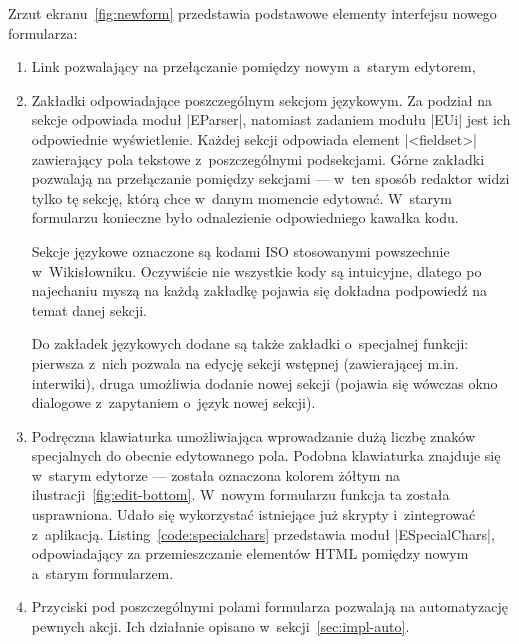 Zrzut ekranu~\ref{fig:newform} przedstawia podstawowe elementy interfejsu nowego formularza:
\begin{enumerate}
\item Link pozwalający na przełączanie pomiędzy nowym a~starym edytorem,
\item Zakładki odpowiadające poszczególnym sekcjom językowym. Za podział na sekcje odpowiada moduł \kod|EParser|, natomiast zadaniem modułu \kod|EUi| jest ich odpowiednie wyświetlenie. Każdej sekcji odpowiada element \kod|<fieldset>| zawierający pola tekstowe z~poszczególnymi podsekcjami. Górne zakładki pozwalają na przełączanie pomiędzy sekcjami --- w~ten sposób redaktor widzi tylko tę sekcję, którą chce w~danym momencie edytować. W~starym formularzu konieczne było odnalezienie odpowiedniego kawałka kodu.

Sekcje językowe oznaczone są kodami ISO stosowanymi powszechnie w~Wikisłowniku. Oczywiście nie wszystkie kody są intuicyjne, dlatego po najechaniu myszą na każdą zakładkę pojawia się dokładna podpowiedź na temat danej sekcji.

Do zakładek językowych dodane są także zakładki o~specjalnej funkcji: pierwsza z~nich pozwala na edycję sekcji wstępnej (zawierającej m.in. interwiki), druga umożliwia dodanie nowej sekcji (pojawia się wówczas okno dialogowe z~zapytaniem o~język nowej sekcji).
\item Podręczna klawiaturka umożliwiająca wprowadzanie dużą liczbę znaków specjalnych do obecnie edytowanego pola. Podobna klawiaturka znajduje się w~starym edytorze --- została oznaczona kolorem żółtym na ilustracji~\ref{fig:edit-bottom}. W~nowym formularzu funkcja ta została usprawniona. Udało się wykorzystać istniejące już skrypty i~zintegrować z~aplikacją. Listing~\ref{code:specialchars} przedstawia moduł \kod|ESpecialChars|, odpowiadający za przemieszczanie elementów HTML pomiędzy nowym a~starym formularzem.
\item Przyciski pod poszczególnymi polami formularza pozwalają na automatyzację pewnych akcji. Ich działanie opisano w~sekcji~\ref{sec:impl-auto}.
\end{enumerate}

